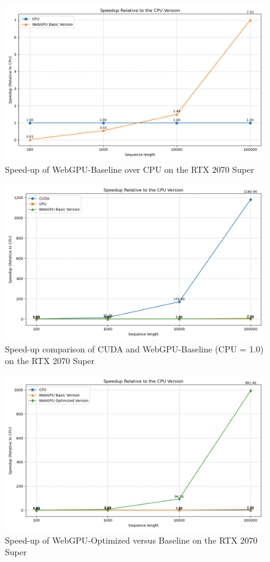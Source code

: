 \documentclass[PhD]{PHlab-thesis}
\begin{document}
\begin{figure}[htbp]
    \centering
    \includegraphics[width=0.7\linewidth]{2070s-1.png}
    \caption{Speed-up of WebGPU-Baseline over CPU on the RTX 2070 Super}
    \label{fig:2070s-wgpu-baseline}
\end{figure}

\begin{figure}[htbp]
    \centering
    \includegraphics[width=0.7\linewidth]{2070s-3.png}
    \caption{Speed-up comparison of CUDA and WebGPU-Baseline (CPU = 1.0) on the RTX 2070 Super}
    \label{fig:2070s-cuda-vs-baseline}
\end{figure}

\begin{figure}[htbp]
    \centering
    \includegraphics[width=0.7\linewidth]{2070s-2.png}
    \caption{Speed-up of WebGPU-Optimized versus Baseline on the RTX 2070 Super}
    \label{fig:2070s-optimized-vs-baseline}
\end{figure}
\end{document}
